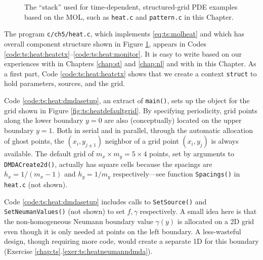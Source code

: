 \begin{figure}
\caption{The \PETSc ``stack'' used for time-dependent, structured-grid PDE examples based on the MOL, such as \texttt{heat.c} and \texttt{pattern.c} in this Chapter.}
\label{fig:ts:stack}
\end{figure}

The program \texttt{c/ch5/heat.c}, which implements \eqref{eq:ts:molheat} and which has overall \PETSc component structure shown in Figure \ref{fig:ts:stack}, appears in Codes \ref{code:ts:heat:heatctx}--\ref{code:ts:heat:monitor}.  It is easy to write based on our experiences with \pDMDA in Chapters \ref{chap:st} and \ref{chap:nl} and with \pTS in this Chapter.  As a first part, Code \ref{code:ts:heat:heatctx} shows that we create a context \texttt{struct} to hold parameters, sources, and the grid.


Code \ref{code:ts:heat:dmdasetup}, an extract of \texttt{main()}, sets up the \pDMDA object for the grid shown in Figure \ref{fig:ts:heatdefaultgrid}.  By specifying periodicity, grid points along the lower boundary $y=0$ are also (conceptually) located on the upper boundary $y=1$.  Both in serial and in parallel, through the automatic allocation of ghost points, the $(x_i,y_{j\pm 1})$ neighbor of a grid point $(x_i,y_j)$ is always available.  The default grid of $m_x \times m_y = 5\times 4$ points, set by arguments to \texttt{DMDACreate2d()}, actually has square cells because the spacings are $h_x=1/(m_x-1)$ and $h_y=1/m_y$ respectively---see function \texttt{Spacings()} in \texttt{heat.c} (not shown).


Code \ref{code:ts:heat:dmdasetup} includes calls to \texttt{SetSource()} and \texttt{SetNeumanValues()} (not shown) to set $f,\gamma$ respectively.  A small idea here is that the non-homogeneous Neumann boundary value $\gamma(y)$ is allocated on a 2D grid even though it is only needed at points on the left boundary.  A less-wasteful design, though requiring more code, would create a separate 1D \pDMDA for this boundary (Exercise \ref{chap:ts}.\ref{exer:ts:heatneumanndmda}).


